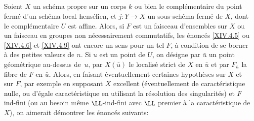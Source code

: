 \subsection{} \label{XIV.6.2}
Soient $X$ un sch\'ema propre sur un corps $k$ ou bien le compl\'ementaire du point ferm\'e d'un sch\'ema local hens\'elien, et $j:Y \to X$ un sous-sch\'ema ferm\'e de $X$, dont le compl\'ementaire $U$ est affine. Alors, si $F$ est un faisceau d'ensembles sur $X$ ou un faisceau en groupes non n\'ecessairement commutatifs, les \'enonc\'es \ref{XIV.4.5} ou \ref{XIV.4.6} et \ref{XIV.4.9} ont encore un sens pour un tel $F$, \`a condition de se borner \`a des petites valeurs de $n$. Si $u$ est un point de $U$, on d\'esigne par $\bar{u}$ un point g\'eom\'etrique au-dessus de~$u$, par $X(\bar{u})$ le localis\'e strict de $X$ en $\bar{u}$ et par $F_{\bar{u}}$ la fibre de $F$ en $\bar{u}$. Alors, en faisant \'eventuellement certaines hypoth\`eses sur $X$ et sur $F$, par exemple en supposant $X$ excellent (\'eventuellement de caract\'eristique nulle, ou d'\'egale caract\'eristique en utilisant la r\'esolution des singularit\'es) et $F$ ind-fini (ou au besoin m\^eme $\LL$-ind-fini avec $\LL$ premier \`a la caract\'eristique de $X$), on aimerait d\'emontrer les \'enonc\'es suivants:
